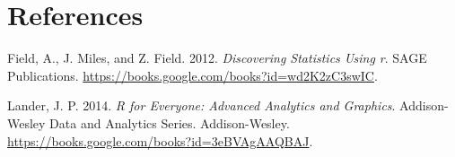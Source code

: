 \documentclass[
]{article}
\newlength{\cslhangindent}
\newenvironment{CSLReferences}[2] %
 {%
  \setlength{\parindent}{0pt}
  \ifodd #1 \everypar{\setlength{\hangindent}{\cslhangindent}}\ignorespaces\fi
  \ifnum #2 > 0
  \setlength{\parskip}{#2\baselineskip}
  \fi
 }%
 {}
\begin{document}
\hypertarget{references}{%
\section*{References}\label{references}}

\hypertarget{refs}{}
\begin{CSLReferences}{1}{0}
\leavevmode{}%
Field, A., J. Miles, and Z. Field. 2012. \emph{Discovering Statistics
Using r}. SAGE Publications.
\url{https://books.google.com/books?id=wd2K2zC3swIC}.

\leavevmode{}%
Lander, J. P. 2014. \emph{R for Everyone: Advanced Analytics and
Graphics}. Addison-Wesley Data and Analytics Series. Addison-Wesley.
\url{https://books.google.com/books?id=3eBVAgAAQBAJ}.

\end{CSLReferences}
\end{document}
